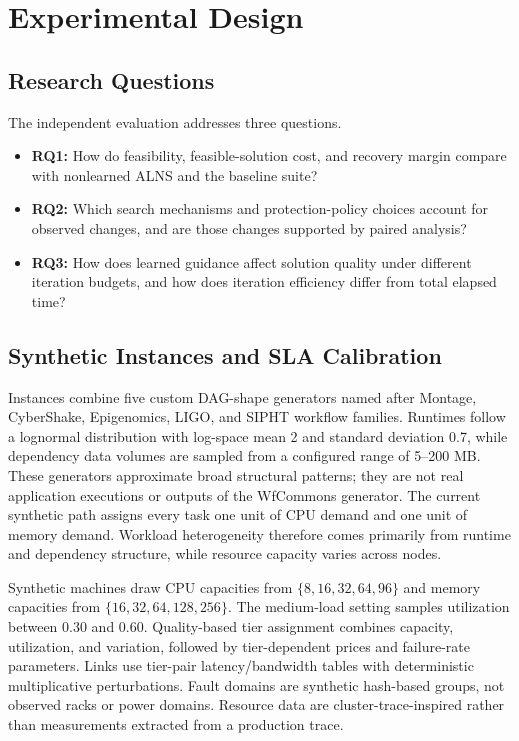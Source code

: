 \section{Experimental Design}
\label{sec:experiments}

\subsection{Research Questions}
The independent evaluation addresses three questions.
\begin{itemize}
 \item \textbf{RQ1:} How do feasibility, feasible-solution cost, and recovery
 margin compare with nonlearned ALNS and the baseline suite?
 \item \textbf{RQ2:} Which search mechanisms and protection-policy choices
 account for observed changes, and are those changes supported by paired
 analysis?
 \item \textbf{RQ3:} How does learned guidance affect solution quality under
 different iteration budgets, and how does iteration efficiency differ from
 total elapsed time?
\end{itemize}

\subsection{Synthetic Instances and SLA Calibration}
Instances combine five custom DAG-shape generators named after Montage,
CyberShake, Epigenomics, LIGO, and SIPHT workflow families. Runtimes follow a
lognormal distribution with log-space mean 2 and standard deviation 0.7,
while dependency data volumes are sampled from a
configured range of 5--200 MB. These generators approximate broad structural
patterns; they are not real application executions or outputs of the
WfCommons generator. The current synthetic path assigns every task one unit
of CPU demand and one unit of memory demand. Workload heterogeneity therefore
comes primarily from runtime and dependency structure, while resource
capacity varies across nodes.

Synthetic machines draw CPU capacities from $\{8,16,32,64,96\}$ and memory
capacities from $\{16,32,64,128,256\}$. The medium-load setting samples
utilization between 0.30 and 0.60. Quality-based tier assignment combines
capacity, utilization, and variation, followed by tier-dependent prices and
failure-rate parameters. Links use tier-pair latency/bandwidth tables with
deterministic multiplicative perturbations. Fault domains are synthetic
hash-based groups, not observed racks or power domains. Resource data are
cluster-trace-inspired rather than measurements extracted from a production
trace.

